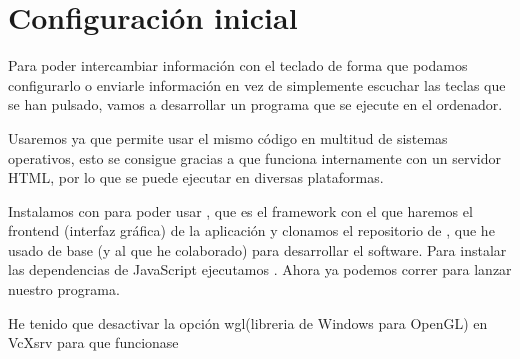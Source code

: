 \section{Configuración inicial}
Para poder intercambiar información con el teclado de forma que podamos configurarlo o enviarle información en vez de simplemente escuchar las teclas que se han pulsado, vamos a desarrollar un programa que se ejecute en el ordenador. 

Usaremos  ya que permite usar el mismo código en multitud de sistemas operativos, esto se consigue gracias a que funciona internamente con un servidor HTML, por lo que se puede ejecutar en diversas plataformas.

Instalamos  con  para poder usar , que es el framework con el que haremos el frontend (interfaz gráfica) de la aplicación y clonamos el repositorio de , que he usado de base (y al que he colaborado) para desarrollar el software. Para instalar las dependencias de JavaScript ejecutamos . Ahora ya podemos correr  para lanzar nuestro programa. \par

\hr
He tenido que desactivar la opción wgl(libreria de Windows para OpenGL) en VcXsrv para que funcionase
\hr
